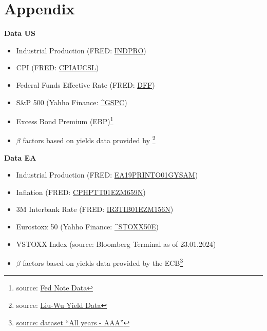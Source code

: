 \section{Appendix}
\label{sec:appendix}

\textbf{Data US}
\begin{itemize}

    \item Industrial Production (FRED: \href{https://fred.stlouisfed.org/series/INDPRO}{INDPRO}) 
    \item CPI (FRED: \href{https://fred.stlouisfed.org/series/CPIAUCSL}{CPIAUCSL})
    \item Federal Funds Effective Rate (FRED: \href{https://fred.stlouisfed.org/series/DFF}{DFF})
    \item S\&P 500 (Yahho Finance: \href{https://finance.yahoo.com/quote/%5EGSPC?p=^GSPC&.tsrc=fin-srch}{\textasciicircum GSPC})
    \item Excess Bond Premium (EBP)\footnote{source: \href{https://www.federalreserve.gov/econres/notes/feds-notes/ebp_csv.csv}{Fed Note Data}}
    \item $\beta$ factors based on yields data provided by \citet{liu2021reconstructing}\footnote{source: \href{https://sites.google.com/view/jingcynthiawu/yield-data}{Liu-Wu Yield Data}}
\end{itemize}



\textbf{Data EA}
\begin{itemize}

    \item Industrial Production (FRED: \href{https://fred.stlouisfed.org/series/EA19PRINTO01GYSAM}{EA19PRINTO01GYSAM})
    \item Inflation (FRED: \href{https://fred.stlouisfed.org/series/CPHPTT01EZM659N}{CPHPTT01EZM659N})
    \item 3M Interbank Rate (FRED: \href{https://fred.stlouisfed.org/series/IR3TIB01EZM156N}{IR3TIB01EZM156N})
    \item Eurostoxx 50 (Yahho Finance: \href{https://de.finance.yahoo.com/quote/%5ESTOXX50E/}{\textasciicircum STOXX50E})
    \item VSTOXX Index (source: Bloomberg Terminal as of 23.01.2024)
    \item $\beta$ factors based on yields data provided by the ECB\footnote{\href{https://www.ecb.europa.eu/stats/financial_markets_and_interest_rates/euro_area_yield_curves/html/index.en.html}{source: dataset ``All years - AAA''}}
\end{itemize}